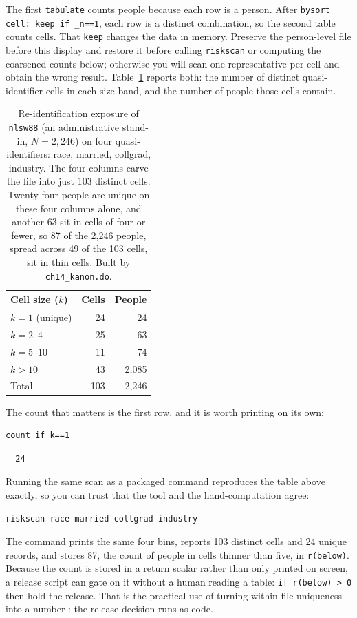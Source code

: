 The first \texttt{tabulate} counts people because each row is a person. After \texttt{bysort cell: keep if \_n==1}, each row is a distinct combination, so the second table counts cells. That \texttt{keep} changes the data in memory. Preserve the person-level file before this display and restore it before calling \texttt{riskscan} or computing the coarsened counts below; otherwise you will scan one representative per cell and obtain the wrong result. Table~\ref{tab:kanon} reports both: the number of distinct quasi-identifier cells in each size band, and the number of people those cells contain.

\begin{table}[htbp]
\centering
{\footnotesize
\begin{tabular}{lrr}
\hline
Cell size ($k$) & Cells & People \\
\hline
$k=1$ (unique)   &  24 &    24 \\
$k=2$--$4$        &  25 &    63 \\
$k=5$--$10$       &  11 &    74 \\
$k>10$            &  43 & 2{,}085 \\
\hline
Total            & 103 & 2{,}246 \\
\hline
\end{tabular}
}
\caption[$k$-anonymity of four ordinary columns]{Re-identification exposure of \texttt{nlsw88} (an administrative stand-in, $N=2{,}246$) on four quasi-identifiers: race, married, collgrad, industry. The four columns carve the file into just 103 distinct cells. Twenty-four people are unique on these four columns alone, and another 63 sit in cells of four or fewer, so 87 of the 2{,}246 people, spread across 49 of the 103 cells, sit in thin cells. Built by \texttt{ch14\_kanon.do}.}
\label{tab:kanon}
\end{table}

The count that matters is the first row, and it is worth printing on its own:
\par
{\footnotesize
\begin{verbatim}
count if k==1
\end{verbatim}
}
\par
{\footnotesize
\begin{verbatim}
  24
\end{verbatim}
}
Running the same scan as a packaged command reproduces the table above exactly, so you can trust that the tool and the hand-computation agree:
\par
{\footnotesize
\begin{verbatim}
riskscan race married collgrad industry
\end{verbatim}
}
The command prints the same four bins, reports 103 distinct cells and 24 unique records, and stores 87, the count of people in cells thinner than five, in \texttt{r(below)}. Because the count is stored in a return scalar rather than only printed on screen, a release script can gate on it without a human reading a table: \texttt{if r(below) > 0} then hold the release. That is the practical use of turning within-file uniqueness into a number \parencite{elemam2008kanon}: the release decision runs as code.

